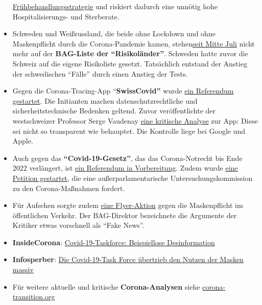\begin{itemize}
  \href{https://swprs.org/zur-behandlung-von-covid-19/}{Frühbehandlungsstrategie}
  und riskiert dadurch eine unnötig hohe Hospitalisierungs- und
  Sterberate.
\item
  Schweden und Weißrussland, die beide ohne Lockdown und ohne
  Maskenpflicht durch die Corona-Pandemie kamen,
  stehen\href{https://www.nau.ch/news/schweiz/42-lander-schweiz-hat-liste-der-corona-risikolander-erweitert-65747991}{seit
  Mitte Juli} nicht mehr auf der \textbf{BAG-Liste der
  ``Risikoländer''}. Schweden hatte zuvor die Schweiz auf die eigene
  Risikoliste gesetzt. Tatsächlich entstand der Anstieg der schwedischen
  ``Fälle'' durch einen Anstieg der Tests.
\item
  Gegen die Corona-Tracing-App ``\textbf{SwissCovid''} wurde
  \href{https://corona-transition.org/referendum-gegen-die-swisscovid-app-gestartet}{ein
  Referendum gestartet}. Die Initianten machen datenschutzrechtliche und
  sicherheitstechnische Bedenken geltend. Zuvor veröffentlichte der
  westschweizer Professor Serge Vaudenay
  \href{https://swprs.org/corona-app-ein-eklatanter-betrug/}{eine
  kritische Analyse} zur App: Diese sei nicht so transparent wie
  behauptet. Die Kontrolle liege bei Google und Apple.
\item
  Auch gegen das \textbf{``Covid-19-Gesetz''}, das das Corona-Notrecht
  bis Ende 2022 verlängert, ist
  \href{https://notrecht-referendum.ch/}{ein Referendum in
  Vorbereitung}. Zudem wurde \href{https://fruehling2020.com/}{eine
  Petition gestartet}, die eine außer­parla­mentarische
  Untersuchungs­kommission zu den Corona-Maßnahmen fordert.
\item
  Für Aufsehen sorgte zudem
  \href{https://www.20min.ch/story/bag-warnt-vor-fake-news-flyer-der-maskengegner-559612676323}{eine
  Flyer-Aktion} gegen die Maskenpflicht im öffentlichen Verkehr. Der
  BAG-Direktor bezeichnete die Argumente der Kritiker etwas vorschnell
  als ``Fake News''.
\item
  \textbf{InsideCorona}:
  \href{https://www.insidecorona.ch/2020/07/29/beispiellose-desinformation/}{Covid-19-Taskforce:
  Beispiellose Desinformation}
\item
  \textbf{Infosperber}:
  \href{https://www.infosperber.ch/Artikel/Gesundheit/Task-Force-tauscht-Offentlichkeit-uber-den-Nutzen-der-Masken}{Die
  Covid-19-Task Force übertrieb den Nutzen der Masken massiv}
\item
  Für weitere aktuelle und kritische \textbf{Corona-Analysen} siehe
  \href{https://corona-transition.org/}{corona-transition.org}
\end{itemize}

